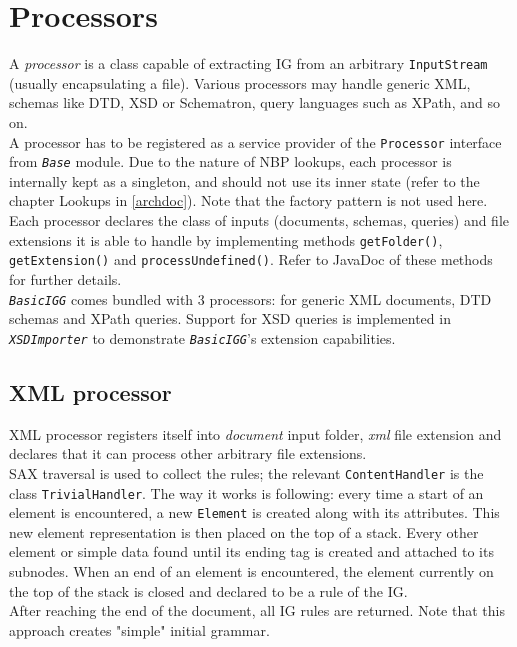 \documentclass[a4paper,10pt,oneside]{article}
\newcommand{\code}[1]{\texttt{#1}}
\newcommand{\jmodule}[1]{\texttt{\textit{#1}}}
\begin{document}
\section{Processors}

A \emph{processor} is a class capable of extracting IG from an arbitrary \code{InputStream} (usually encapsulating a file). Various processors may handle generic XML, schemas like DTD, XSD or Schematron, query languages such as XPath, and so on.\\
A processor has to be registered as a service provider of the \code{Processor} interface from \jmodule{Base} module. Due to the nature of NBP lookups, each processor is internally kept as a singleton, and should not use its inner state (refer to the chapter Lookups in \ref{archdoc}). Note that the factory pattern is not used here.\\ %
Each processor declares the class of inputs (documents, schemas, queries) and file extensions it is able to handle by implementing methods \code{getFolder()}, \code{getExtension()} and \code{processUndefined()}. Refer to JavaDoc of these methods for further details.\\

\jmodule{BasicIGG} comes bundled with 3 processors: for generic XML documents, DTD schemas and XPath queries. Support for XSD queries is implemented in \jmodule{XSDImporter} to demonstrate \jmodule{BasicIGG}'s extension capabilities.

\subsection{XML processor}

XML processor registers itself into \emph{document} input folder, \emph{xml} file extension and declares that it can process other arbitrary file extensions.\\
SAX traversal is used to collect the rules; the relevant \code{ContentHandler} is the class \code{TrivialHandler}. The way it works is following: every time a start of an element is encountered, a new \code{Element} is created along with its attributes. This new element representation is then placed on the top of a stack. Every other element or simple data found until its ending tag is created and attached to its subnodes. When an end of an element is encountered, the element currently on the top of the stack is closed and declared to be a rule of the IG.\\
After reaching the end of the document, all IG rules are returned. Note that this approach creates "simple" initial grammar.
\end{document}
